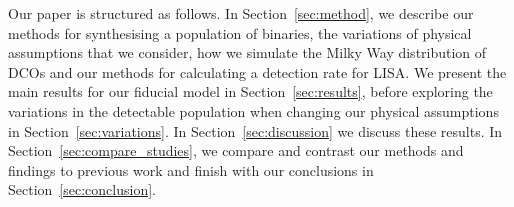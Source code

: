 Our paper is structured as follows. In Section~\ref{sec:method}, we describe our methods for synthesising a population of binaries, the variations of physical assumptions that we consider, how we simulate the Milky Way distribution of DCOs and our methods for calculating a detection rate for LISA. We present the main results for our fiducial model in Section~\ref{sec:results}, before exploring the variations in the detectable population when changing our physical assumptions in Section~\ref{sec:variations}. In Section~\ref{sec:discussion} we discuss these results. In Section~\ref{sec:compare_studies}, we compare and contrast our methods and findings to previous work and finish with our conclusions in Section~\ref{sec:conclusion}.